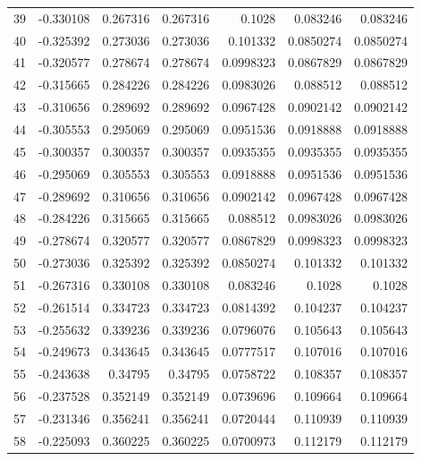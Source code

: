 \begin{tabular}{rrrrrrr}
  39 & -0.330108    & 0.267316    & 0.267316    &  0.1028      & 0.083246    & 0.083246    \\
  40 & -0.325392    & 0.273036    & 0.273036    &  0.101332    & 0.0850274   & 0.0850274   \\
  41 & -0.320577    & 0.278674    & 0.278674    &  0.0998323   & 0.0867829   & 0.0867829   \\
  42 & -0.315665    & 0.284226    & 0.284226    &  0.0983026   & 0.088512    & 0.088512    \\
  43 & -0.310656    & 0.289692    & 0.289692    &  0.0967428   & 0.0902142   & 0.0902142   \\
  44 & -0.305553    & 0.295069    & 0.295069    &  0.0951536   & 0.0918888   & 0.0918888   \\
  45 & -0.300357    & 0.300357    & 0.300357    &  0.0935355   & 0.0935355   & 0.0935355   \\
  46 & -0.295069    & 0.305553    & 0.305553    &  0.0918888   & 0.0951536   & 0.0951536   \\
  47 & -0.289692    & 0.310656    & 0.310656    &  0.0902142   & 0.0967428   & 0.0967428   \\
  48 & -0.284226    & 0.315665    & 0.315665    &  0.088512    & 0.0983026   & 0.0983026   \\
  49 & -0.278674    & 0.320577    & 0.320577    &  0.0867829   & 0.0998323   & 0.0998323   \\
  50 & -0.273036    & 0.325392    & 0.325392    &  0.0850274   & 0.101332    & 0.101332    \\
  51 & -0.267316    & 0.330108    & 0.330108    &  0.083246    & 0.1028      & 0.1028      \\
  52 & -0.261514    & 0.334723    & 0.334723    &  0.0814392   & 0.104237    & 0.104237    \\
  53 & -0.255632    & 0.339236    & 0.339236    &  0.0796076   & 0.105643    & 0.105643    \\
  54 & -0.249673    & 0.343645    & 0.343645    &  0.0777517   & 0.107016    & 0.107016    \\
  55 & -0.243638    & 0.34795     & 0.34795     &  0.0758722   & 0.108357    & 0.108357    \\
  56 & -0.237528    & 0.352149    & 0.352149    &  0.0739696   & 0.109664    & 0.109664    \\
  57 & -0.231346    & 0.356241    & 0.356241    &  0.0720444   & 0.110939    & 0.110939    \\
  58 & -0.225093    & 0.360225    & 0.360225    &  0.0700973   & 0.112179    & 0.112179    \\

\end{tabular}

